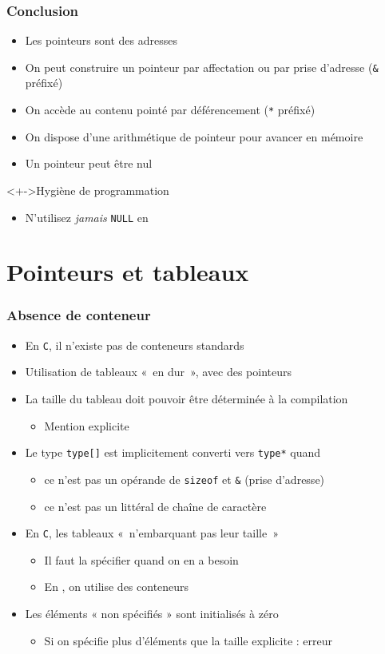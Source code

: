 \begin{frame}
\frametitle{Conclusion}
\begin{itemize}[<+->]
\item Les pointeurs sont des adresses
\item On peut construire un pointeur par affectation ou par prise d'adresse (\texttt{\&} préfixé)
\item On accède au contenu pointé par déférencement (\texttt{*} préfixé)
\item On dispose d'une arithmétique de pointeur pour avancer en mémoire
\item Un pointeur peut être nul
\end{itemize}
\begin{block}<+->{Hygiène de programmation}
	\begin{itemize}[<+->]
	\item N'utilisez \emph{jamais} \lstinline|NULL| en \cpp
	\end{itemize}
\end{block}
\end{frame}

\section{Pointeurs et tableaux}

\begin{frame}
\frametitle{Absence de conteneur}
\begin{itemize}[<+->]
\item En \texttt{C}, il n'existe pas de conteneurs standards	
\item Utilisation de tableaux «~en dur~», avec des pointeurs
\item La taille du tableau doit pouvoir être déterminée à la compilation
	\begin{itemize}
	\item Mention explicite
	\end{itemize}
\item Le type \texttt{type[]} est implicitement converti vers \texttt{type*} quand
	\begin{itemize}
	\item ce n'est pas un opérande de \texttt{sizeof} et \texttt{\&} (prise d'adresse)
	\item ce n'est pas un littéral de chaîne de caractère
	\end{itemize}
\item En \texttt{C}, les tableaux «~n'embarquant pas leur taille~»
	\begin{itemize}
	\item Il faut la spécifier quand on en a besoin
	\item En \cpp, on utilise des conteneurs
	\end{itemize}
\item Les éléments « non spécifiés » sont initialisés à zéro
	\begin{itemize}
	\item Si on spécifie plus d'éléments que la taille explicite : erreur
	\end{itemize}
\end{itemize}
\end{frame}

